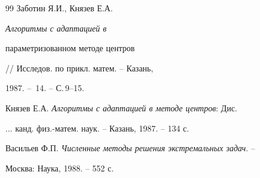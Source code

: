 \begin{thebibliography}{99}
Заботин Я.И., Князев Е.А. {\it Алгоритмы с адаптацией в


параметризованном методе центров} // Исследов. по прикл. матем. -- Казань,


1987. -- \No\,14. -- С.\,9--15. 




Князев Е.А. {\it Алгоритмы с адаптацией в методе центров}: Дис.


$\dotsc$ канд. физ.-матем. наук. -- Казань, 1987. -- 134 с.




Васильев Ф.П. {\it Численные методы решения экстремальных задач}. -- 


Москва: Наука, 1988. -- 552 с.





\end{thebibliography}





\vskip 2cm












\label{end}





